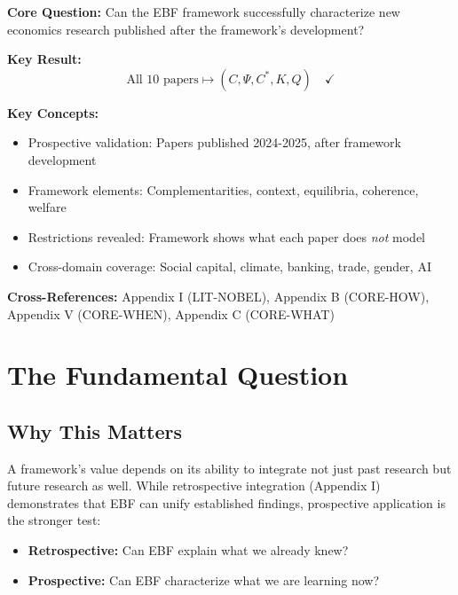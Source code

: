 \begin{tcolorbox}[colback=blue!5!white, colframe=blue!75!black,
    title=Quick Reference: Recent Papers Integration]

\textbf{Core Question:} Can the EBF framework successfully characterize new
economics research published after the framework's development?

\textbf{Key Result:}
\begin{equation}
\text{All 10 papers} \mapsto (C, \Psi, C^*, K, Q) \quad \checkmark
\end{equation}

\textbf{Key Concepts:}
\begin{itemize}[nosep]
\item Prospective validation: Papers published 2024-2025, after framework development
\item Framework elements: Complementarities, context, equilibria, coherence, welfare
\item Restrictions revealed: Framework shows what each paper does \emph{not} model
\item Cross-domain coverage: Social capital, climate, banking, trade, gender, AI
\end{itemize}

\textbf{Cross-References:} Appendix I (LIT-NOBEL), Appendix B (CORE-HOW),
Appendix V (CORE-WHEN), Appendix C (CORE-WHAT)
\end{tcolorbox}


\section{The Fundamental Question}
\label{sec:J-fundamental}

\subsection{Why This Matters}

A framework's value depends on its ability to integrate not just past research
but future research as well. While retrospective integration (Appendix I)
demonstrates that EBF can unify established findings, prospective application
is the stronger test:

\begin{itemize}
    \item \textbf{Retrospective:} Can EBF explain what we already knew?
    \item \textbf{Prospective:} Can EBF characterize what we are learning now?
\end{itemize}

